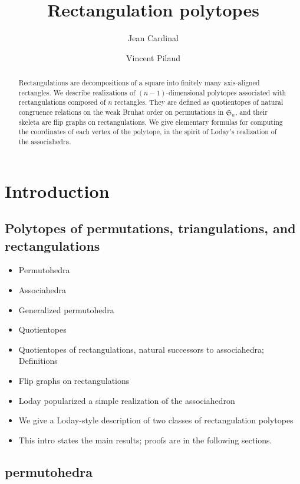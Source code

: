 \documentclass{amsart}
\title{Rectangulation polytopes}
\author{Jean Cardinal}
\author{Vincent Pilaud}
\theoremstyle{definition}
\newcommand{\f}[1]{\mathfrak{#1}} %
\begin{document}
\begin{abstract}
  Rectangulations are decompositions of a square into finitely many axis-aligned rectangles.
  We describe realizations of $(n-1)$-dimensional polytopes associated with rectangulations composed of $n$ rectangles. They are defined as quotientopes of natural congruence relations on the weak Bruhat order on permutations in $\f{S}_n$, and their skeleta are flip graphs on rectangulations. We give  elementary formulas for computing the coordinates of each vertex of the polytope, in the spirit of Loday's realization of the associahedra.
\end{abstract}

\maketitle

\tableofcontents

\newpage

\section{Introduction}

\subsection{Polytopes of permutations, triangulations, and rectangulations}

\begin{itemize}
\item Permutohedra
\item Associahedra
\item Generalized permutohedra
\item Quotientopes
\item Quotientopes of rectangulations, natural successors to associahedra; Definitions
\item Flip graphs on rectangulations
\item Loday popularized a simple realization of the associahedron
\item We give a Loday-style description of two classes of rectangulation polytopes
\item This intro states the main results; proofs are in the following sections.
\end{itemize}

\subsection{permutohedra}
\end{document}
